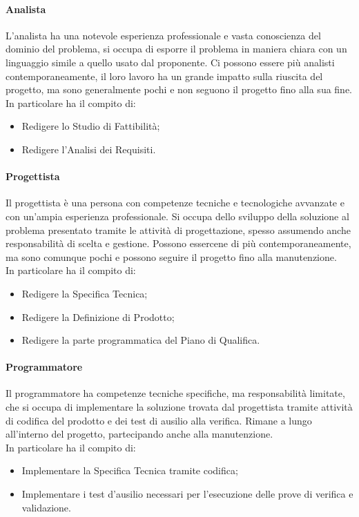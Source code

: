 \documentclass[../norme_di_progetto.tex]{subfiles}
\begin{document}
        \paragraph{Analista}
        L'analista ha una notevole esperienza professionale e vasta conoscienza del dominio del problema, si occupa di esporre il problema in maniera chiara con un linguaggio simile a quello usato dal proponente. Ci possono essere più analisti contemporaneamente, il loro lavoro ha un grande impatto sulla riuscita del progetto, ma sono generalmente pochi e non seguono il progetto fino alla sua fine.\\
        In particolare ha il compito di:
        \begin{itemize} 
            \item Redigere lo Studio di Fattibilità;
            \item Redigere l'Analisi dei Requisiti.
        \end{itemize}

        \paragraph{Progettista}
        Il progettista è una persona con competenze tecniche e tecnologiche avvanzate e con un'ampia esperienza professionale. Si occupa dello sviluppo della soluzione al problema presentato tramite le attività di progettazione, spesso assumendo anche responsabilità di scelta e gestione. Possono essercene di più contemporaneamente, ma sono comunque pochi e possono seguire il progetto fino alla manutenzione.\\
        In particolare ha il compito di:
        \begin{itemize}
            \item Redigere la Specifica Tecnica;
            \item Redigere la Definizione di Prodotto;
            \item Redigere la parte programmatica del Piano di Qualifica.
        \end{itemize}

        \paragraph{Programmatore}
        Il programmatore ha competenze tecniche specifiche, ma responsabilità limitate, che si occupa di implementare la soluzione trovata dal progettista tramite attività di codifica del prodotto e dei test di ausilio alla verifica. Rimane a lungo all'interno del progetto, partecipando anche alla manutenzione.\\
        In particolare ha il compito di:
        \begin{itemize}
            \item Implementare la Specifica Tecnica tramite codifica;
            \item Implementare i test d'ausilio necessari per l'esecuzione delle prove di verifica e validazione.
        \end{itemize}
\end{document}
